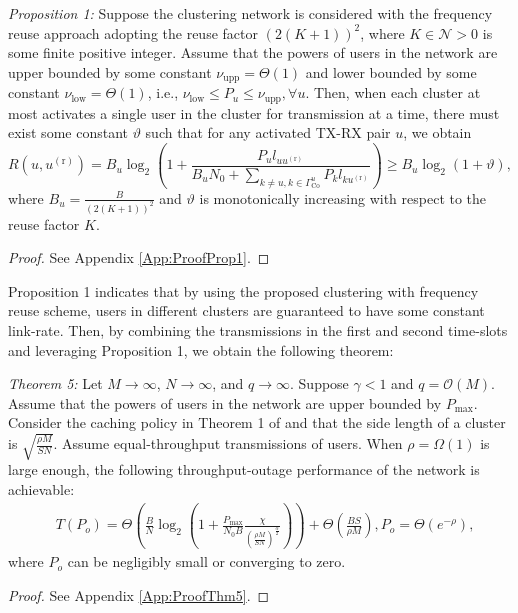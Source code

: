 \documentclass[journal,draftclsnofoot,onecolumn,12pt,twoside]{IEEEtran}
\begin{document}
{\em Proposition 1:} Suppose the clustering network is considered with the frequency reuse approach adopting the reuse factor $(2(K+1))^2$, where $K\in\mathcal{N}>0$ is some finite positive integer. Assume that the powers of users in the network are upper bounded by some constant $\nu_{\text{upp}}=\Theta(1)$ and lower bounded by some constant $\nu_{\text{low}}=\Theta(1)$, i.e., $\nu_{\text{low}}\leq P_u\leq \nu_{\text{upp}},\forall u$. Then, when each cluster at most activates a single user in the cluster for transmission at a time, there must exist some constant $\vartheta$ such that for any activated TX-RX pair $u$, we obtain
\begin{equation}
R(u,u^{(\text{r})})=B_u\log_2\left(1+\frac{P_ul_{uu^{(\text{r})}}}{B_uN_0+\sum_{k\neq u,k\in\Gamma^u_{\text{Co}}}P_kl_{ku^{(\text{r})}}}\right)\geq B_u\log_2(1+\vartheta),
\end{equation}
where $B_u=\frac{B}{(2(K+1))^2}$ and $\vartheta$ is monotonically increasing with respect to the reuse factor $K$.
\begin{proof}
See Appendix \ref{App:ProofProp1}.
\end{proof}

Proposition 1 indicates that by using the proposed clustering with frequency reuse scheme, users in different clusters are guaranteed to have some constant link-rate. Then, by combining the transmissions in the first and second time-slots and leveraging Proposition 1, we obtain the following theorem:

{\em Theorem 5:} Let $M\to\infty$, $N\to\infty$, and $q\to\infty$. Suppose $\gamma<1$ and $q=\mathcal{O}(M)$. Assume that the powers of users in the network are upper bounded by $P_{\text{max}}$. Consider the caching policy in Theorem 1 of \cite{lee2020optimal} and that the side length of a cluster is $\sqrt{\frac{\rho M}{SN}}$. Assume equal-throughput transmissions of users. When $\rho=\Omega(1)$ is large enough, the following throughput-outage performance of the network is achievable:
\begin{equation}
\begin{aligned}
&T(P_o)= \Theta\left(\frac{B}{N}\log_2\left(1+\frac{P_{\text{max}}}{N_0B}\frac{\chi}{\left(\frac{\rho M}{SN}\right)^\frac{\alpha}{2}}\right)\right)+\Theta\left(\frac{BS}{\rho M}\right),P_o= \Theta\left(e^{-\rho}\right),
\end{aligned}
\end{equation}
where $P_o$ can be negligibly small or converging to zero.
\begin{proof}
See Appendix \ref{App:ProofThm5}.
\end{proof}
\end{document}
